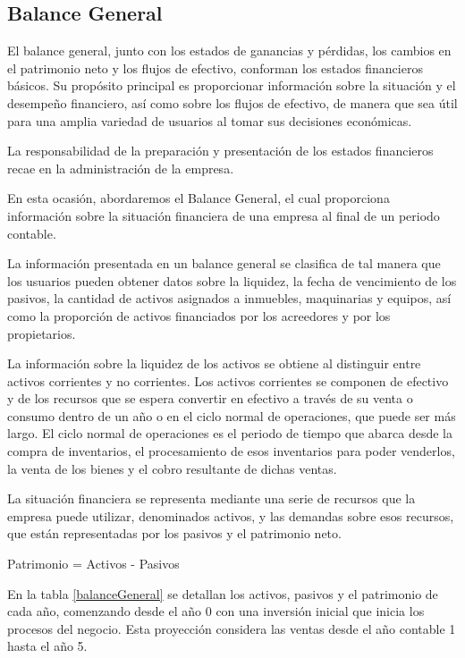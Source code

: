\subsection{Balance General}

El balance general, junto con los estados de ganancias y pérdidas, los cambios en el patrimonio neto y los flujos de efectivo, conforman los estados financieros básicos. Su propósito principal es proporcionar información sobre la situación y el desempeño financiero, así como sobre los flujos de efectivo, de manera que sea útil para una amplia variedad de usuarios al tomar sus decisiones económicas.

La responsabilidad de la preparación y presentación de los estados financieros recae en la administración de la empresa.

En esta ocasión, abordaremos el Balance General, el cual proporciona información sobre la situación financiera de una empresa al final de un periodo contable.

La información presentada en un balance general se clasifica de tal manera que los usuarios pueden obtener datos sobre la liquidez, la fecha de vencimiento de los pasivos, la cantidad de activos asignados a inmuebles, maquinarias y equipos, así como la proporción de activos financiados por los acreedores y por los propietarios.

La información sobre la liquidez de los activos se obtiene al distinguir entre activos corrientes y no corrientes. Los activos corrientes se componen de efectivo y de los recursos que se espera convertir en efectivo a través de su venta o consumo dentro de un año o en el ciclo normal de operaciones, que puede ser más largo. El ciclo normal de operaciones es el periodo de tiempo que abarca desde la compra de inventarios, el procesamiento de esos inventarios para poder venderlos, la venta de los bienes y el cobro resultante de dichas ventas.

La situación financiera se representa mediante una serie de recursos que la empresa puede utilizar, denominados activos, y las demandas sobre esos recursos, que están representadas por los pasivos y el patrimonio neto.

\begin{center}
    Patrimonio = Activos - Pasivos
\end{center}

En la tabla \ref{balanceGeneral} se detallan los activos, pasivos y el patrimonio de cada año, comenzando desde el año 0 con una inversión inicial que inicia los procesos del negocio. Esta proyección considera las ventas desde el año contable 1 hasta el año 5.

